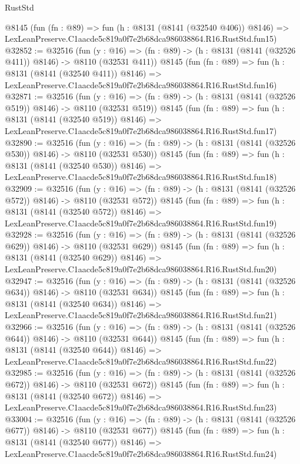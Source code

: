 \begin{lexlean}{RustStd}
\begin{coremodule}
    @8145
    (fun (fn : @89) =>
    fun (h : @8131 (@8141 (@32540 @406)) @8146) =>
    LexLeanPreserve.C1aacde5c819a0f7e2b68dca986038864.R16.RustStd.fun15)
@32852 := @32516
    (fun (y : @16) => (fn : @89) -> (h : @8131 (@8141 (@32526 @411)) @8146) -> @8110 (@32531 @411))
    @8145
    (fun (fn : @89) =>
    fun (h : @8131 (@8141 (@32540 @411)) @8146) =>
    LexLeanPreserve.C1aacde5c819a0f7e2b68dca986038864.R16.RustStd.fun16)
@32871 := @32516
    (fun (y : @16) => (fn : @89) -> (h : @8131 (@8141 (@32526 @519)) @8146) -> @8110 (@32531 @519))
    @8145
    (fun (fn : @89) =>
    fun (h : @8131 (@8141 (@32540 @519)) @8146) =>
    LexLeanPreserve.C1aacde5c819a0f7e2b68dca986038864.R16.RustStd.fun17)
@32890 := @32516
    (fun (y : @16) => (fn : @89) -> (h : @8131 (@8141 (@32526 @530)) @8146) -> @8110 (@32531 @530))
    @8145
    (fun (fn : @89) =>
    fun (h : @8131 (@8141 (@32540 @530)) @8146) =>
    LexLeanPreserve.C1aacde5c819a0f7e2b68dca986038864.R16.RustStd.fun18)
@32909 := @32516
    (fun (y : @16) => (fn : @89) -> (h : @8131 (@8141 (@32526 @572)) @8146) -> @8110 (@32531 @572))
    @8145
    (fun (fn : @89) =>
    fun (h : @8131 (@8141 (@32540 @572)) @8146) =>
    LexLeanPreserve.C1aacde5c819a0f7e2b68dca986038864.R16.RustStd.fun19)
@32928 := @32516
    (fun (y : @16) => (fn : @89) -> (h : @8131 (@8141 (@32526 @629)) @8146) -> @8110 (@32531 @629))
    @8145
    (fun (fn : @89) =>
    fun (h : @8131 (@8141 (@32540 @629)) @8146) =>
    LexLeanPreserve.C1aacde5c819a0f7e2b68dca986038864.R16.RustStd.fun20)
@32947 := @32516
    (fun (y : @16) => (fn : @89) -> (h : @8131 (@8141 (@32526 @634)) @8146) -> @8110 (@32531 @634))
    @8145
    (fun (fn : @89) =>
    fun (h : @8131 (@8141 (@32540 @634)) @8146) =>
    LexLeanPreserve.C1aacde5c819a0f7e2b68dca986038864.R16.RustStd.fun21)
@32966 := @32516
    (fun (y : @16) => (fn : @89) -> (h : @8131 (@8141 (@32526 @644)) @8146) -> @8110 (@32531 @644))
    @8145
    (fun (fn : @89) =>
    fun (h : @8131 (@8141 (@32540 @644)) @8146) =>
    LexLeanPreserve.C1aacde5c819a0f7e2b68dca986038864.R16.RustStd.fun22)
@32985 := @32516
    (fun (y : @16) => (fn : @89) -> (h : @8131 (@8141 (@32526 @672)) @8146) -> @8110 (@32531 @672))
    @8145
    (fun (fn : @89) =>
    fun (h : @8131 (@8141 (@32540 @672)) @8146) =>
    LexLeanPreserve.C1aacde5c819a0f7e2b68dca986038864.R16.RustStd.fun23)
@33004 := @32516
    (fun (y : @16) => (fn : @89) -> (h : @8131 (@8141 (@32526 @677)) @8146) -> @8110 (@32531 @677))
    @8145
    (fun (fn : @89) =>
    fun (h : @8131 (@8141 (@32540 @677)) @8146) =>
    LexLeanPreserve.C1aacde5c819a0f7e2b68dca986038864.R16.RustStd.fun24)

\end{coremodule}
\end{lexlean}
